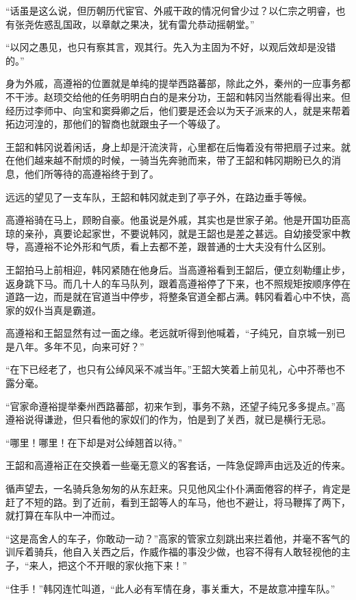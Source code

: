 “话虽是这么说，但历朝历代宦官、外戚干政的情况何曾少过？以仁宗之明睿，也有张尧佐惑乱国政，以章献之果决，犹有雷允恭动摇朝堂。”

“以冈之愚见，也只有察其言，观其行。先入为主固为不好，以观后效却是没错的。”

身为外戚，高遵裕的位置就是单纯的提举西路蕃部，除此之外，秦州的一应事务都不干涉。赵顼交给他的任务明明白白的是来分功，王韶和韩冈当然能看得出来。但经历过李师中、向宝和窦舜卿之后，他们要是还会以为天子派来的人，就是来帮着拓边河湟的，那他们的智商也就跟虫子一个等级了。

王韶和韩冈说着闲话，身上却是汗流浃背，心里都在后悔着没有带把扇子过来。就在他们越来越不耐烦的时候，一骑当先奔驰而来，带了王韶和韩冈期盼已久的消息，他们所等待的高遵裕终于到了。

远远的望见了一支车队，王韶和韩冈就走到了亭子外，在路边垂手等候。

高遵裕骑在马上，顾盼自豪。他虽说是外戚，其实也是世家子弟。他是开国功臣高琼的亲孙，真要论起家世，不要说韩冈，就是王韶也是差之甚远。自幼接受家中教导，高遵裕不论外形和气质，看上去都不差，跟普通的士大夫没有什么区别。

王韶拍马上前相迎，韩冈紧随在他身后。当高遵裕看到王韶后，便立刻勒缰止步，返身跳下马。而几十人的车马队列，跟着高遵裕停了下来，也不照规矩按顺序停在道路一边，而是就在官道当中停步，将整条官道全都占满。韩冈看着心中不快，高家的奴仆当真是霸道。

高遵裕和王韶显然有过一面之缘。老远就听得到他喊着，“子纯兄，自京城一别已是八年。多年不见，向来可好？”

“在下已经老了，也只有公绰风采不减当年。”王韶大笑着上前见礼，心中芥蒂也不露分毫。

“官家命遵裕提举秦州西路蕃部，初来乍到，事务不熟，还望子纯兄多多提点。”高遵裕说得谦逊，但只看他的家奴们的作为，怕是到了关西，就已是横行无忌。

“哪里！哪里！在下却是对公绰翘首以待。”

王韶和高遵裕正在交换着一些毫无意义的客套话，一阵急促蹄声由远及近的传来。

循声望去，一名骑兵急匆匆的从东赶来。只见他风尘仆仆满面倦容的样子，肯定是赶了不短的路。到了近前，看到王韶等人的车马，他也不避让，将马鞭挥了两下，就打算在车队中一冲而过。

“这是高舍人的车子，你敢动一动？”高家的管家立刻跳出来拦着他，并毫不客气的训斥着骑兵，他自入关西之后，作威作福的事没少做，也容不得有人敢轻视他的主子，“来人，把这个不开眼的家伙拖下来！”

“住手！”韩冈连忙叫道，“此人必有军情在身，事关重大，不是故意冲撞车队。”

